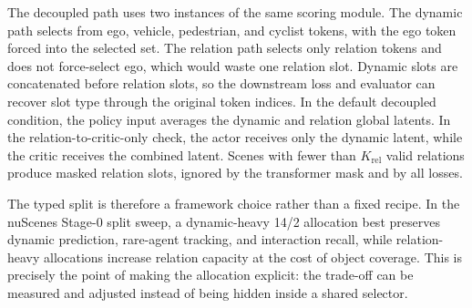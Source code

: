 \documentclass[10pt,journal,compsoc]{IEEEtran}
\begin{document}
The decoupled path uses two instances of the same scoring module. The dynamic path selects from ego, vehicle, pedestrian, and cyclist tokens, with the ego token forced into the selected set. The relation path selects only relation tokens and does not force-select ego, which would waste one relation slot. Dynamic slots are concatenated before relation slots, so the downstream loss and evaluator can recover slot type through the original token indices. In the default decoupled condition, the policy input averages the dynamic and relation global latents. In the relation-to-critic-only check, the actor receives only the dynamic latent, while the critic receives the combined latent. Scenes with fewer than $K_{\mathrm{rel}}$ valid relations produce masked relation slots, ignored by the transformer mask and by all losses.


The typed split is therefore a framework choice rather than a fixed recipe. In the nuScenes Stage-0 split sweep, a dynamic-heavy 14/2 allocation best preserves dynamic prediction, rare-agent tracking, and interaction recall, while relation-heavy allocations increase relation capacity at the cost of object coverage. This is precisely the point of making the allocation explicit: the trade-off can be measured and adjusted instead of being hidden inside a shared selector.


\end{document}
